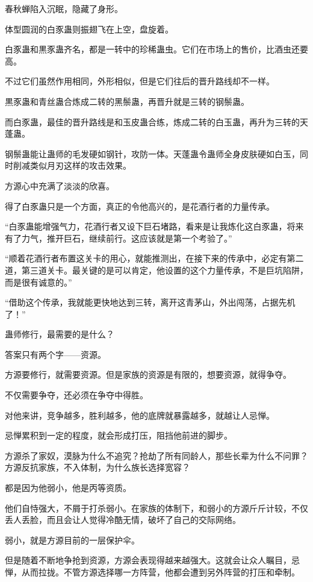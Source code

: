 \begin{this_body}
春秋蝉陷入沉眠，隐藏了身形。

体型圆润的白豕蛊则振翅飞在上空，盘旋着。

白豕蛊和黒豕蛊齐名，都是一转中的珍稀蛊虫。它们在市场上的售价，比酒虫还要高。

不过它们虽然作用相同，外形相似，但是它们往后的晋升路线却不一样。

黒豕蛊和青丝蛊合炼成二转的黑鬃蛊，再晋升就是三转的钢鬃蛊。

而白豕蛊，最佳的晋升路线是和玉皮蛊合练，炼成二转的白玉蛊，再升为三转的天蓬蛊。

钢鬃蛊能让蛊师的毛发硬如钢针，攻防一体。天蓬蛊令蛊师全身皮肤硬如白玉，同时削减类似月刃这样的攻击效果。

方源心中充满了淡淡的欣喜。

得了白豕蛊只是一个方面，真正的令他高兴的，是花酒行者的力量传承。

“白豕蛊能增强气力，花酒行者又设下巨石堵路，看来是让我炼化这白豕蛊，将来有了力气，推开巨石，继续前行。这应该就是第一个考验了。”

“顺着花酒行者布置这关卡的用心，就能推测出，在接下来的传承中，必定有第二道，第三道关卡。最关键的是可以肯定，他设置的这个力量传承，不是巨坑陷阱，而是很有诚意的。”

“借助这个传承，我就能更快地达到三转，离开这青茅山，外出闯荡，占据先机了！”

蛊师修行，最需要的是什么？

答案只有两个字——资源。

方源要修行，就需要资源。但是家族的资源是有限的，想要资源，就得争夺。

不仅需要争夺，还必须在争夺中得胜。

对他来讲，竞争越多，胜利越多，他的底牌就暴露越多，就越让人忌惮。

忌惮累积到一定的程度，就会形成打压，阻挡他前进的脚步。

方源杀了家奴，漠脉为什么不追究？抢劫了所有同龄人，那些长辈为什么不问罪？方源反抗家族，不入体制，为什么族长选择宽容？

都是因为他弱小，他是丙等资质。

他们自恃强大，不屑于打杀弱小。在家族的体制下，和弱小的方源斤斤计较，不仅丢人丢脸，而且会让人觉得冷酷无情，破坏了自己的交际网络。

弱小，就是方源目前的一层保护伞。

但是随着不断地争抢到资源，方源会表现得越来越强大。这就会让众人瞩目，忌惮，从而拉拢。不管方源选择哪一方阵营，他都会遭到另外阵营的打压和牵制。


\end{this_body}
